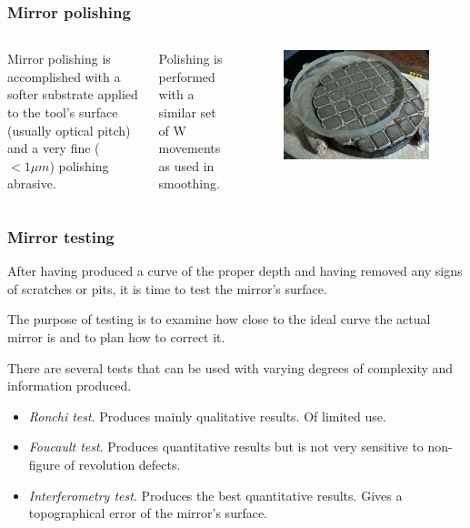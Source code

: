 \documentclass{beamer}
\begin{document}
\begin{frame}
\frametitle{Mirror polishing}
\begin{columns}
Mirror polishing is accomplished with a softer substrate applied to the tool's surface (usually optical pitch) and a very fine ($<1 \mu m$) polishing abrasive.

Polishing is performed with a similar set of W movements as used in smoothing.
\begin{figure}
\includegraphics[scale=0.2]{assets/polishing.jpg}
\end{figure}
\end{columns}
\end{frame}

\begin{frame}
\frametitle{Mirror testing}
After having produced a curve of the proper depth and having removed any signs of scratches or pits, it is time to test the mirror's surface.

The purpose of testing is to examine how close to the ideal curve the actual mirror is and to plan how to correct it.

There are several tests that can be used with varying degrees of complexity and information produced.
\begin{itemize}
\item \textit{Ronchi test}. Produces mainly qualitative results. Of limited use.
\item \textit{Foucault test}. Produces quantitative results but is not very sensitive to non-figure of revolution defects.
\item \textit{Interferometry test}. Produces the best quantitative results. Gives a topographical error of the mirror's surface.
\end{itemize}
\end{frame}
\end{document}
